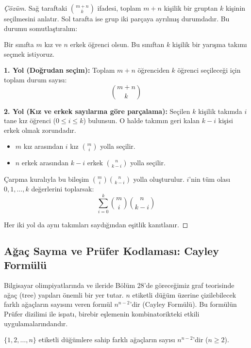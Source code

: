 \begin{proof}[Çözüm]
Sağ taraftaki $\binom{m+n}{k}$ ifadesi, toplam $m+n$ kişilik bir gruptan $k$ kişinin seçilmesini anlatır. Sol tarafta ise grup iki parçaya ayrılmış durumdadır. Bu durumu somutlaştıralım:

Bir sınıfta $m$ kız ve $n$ erkek öğrenci olsun. Bu sınıftan $k$ kişilik bir yarışma takımı seçmek istiyoruz.

\textbf{1. Yol (Doğrudan seçim):}
Toplam $m+n$ öğrenciden $k$ öğrenci seçileceği için toplam durum sayısı:
\[ \binom{m+n}{k} \]

\textbf{2. Yol (Kız ve erkek sayılarına göre parçalama):}
Seçilen $k$ kişilik takımda $i$ tane kız öğrenci ($0 \le i \le k$) bulunsun. O halde takımın geri kalan $k-i$ kişisi erkek olmak zorundadır.
\begin{itemize}
    \item $m$ kız arasından $i$ kız $\binom{m}{i}$ yolla seçilir.
    \item $n$ erkek arasından $k-i$ erkek $\binom{n}{k-i}$ yolla seçilir.
\end{itemize}
Çarpma kuralıyla bu bileşim $\binom{m}{i} \binom{n}{k-i}$ yolla oluşturulur.
$i$'nin tüm olası $0, 1, \dots, k$ değerlerini toplarsak:
\[ \sum_{i=0}^{k} \binom{m}{i} \binom{n}{k-i} \]

Her iki yol da aynı takımları saydığından eşitlik kanıtlanır.
\end{proof}

\subsection{Ağaç Sayma ve Prüfer Kodlaması: Cayley Formülü}

Bilgisayar olimpiyatlarında ve ileride Bölüm 28'de göreceğimiz graf teorisinde ağaç (tree) yapıları önemli bir yer tutar. $n$ etiketli düğüm üzerine çizilebilecek farklı ağaçların sayısını veren formül $n^{n-2}$'dir (Cayley Formülü).
Bu formülün Prüfer dizilimi ile ispatı, birebir eşlemenin kombinatorikteki etkili uygulamalarındandır.

\begin{theorem}
$\{1, 2, \dots, n\}$ etiketli düğümlere sahip farklı ağaçların sayısı $n^{n-2}$'dir ($n \ge 2$).
\end{theorem}

